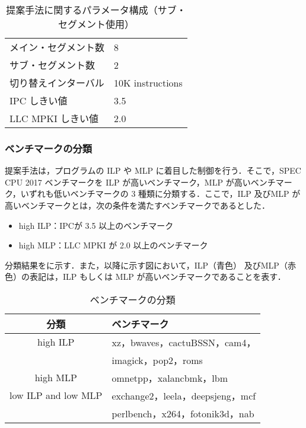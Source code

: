 \begin{table}[tb]
  \caption{提案手法に関するパラメータ構成（サブ・セグメント使用）}
  \footnotesize
  \center
    \begin{tabular}{l|l} \hline \hline
    メイン・セグメント数 & 8 \\
    サブ・セグメント数 & 2 \\
    切り替えインターバル & 10K instructions \\
    IPC しきい値 & 3.5 \\
    LLC MPKI しきい値 & 2.0 \\ \hline 
  \end{tabular}
  \label{tab:switch_config_subseg}
\end{table}

\subsubsection{ベンチマークの分類}
提案手法は，プログラムの ILP や MLP に着目した制御を行う．そこで，SPEC CPU 2017 ベンチマークを ILP が高いベンチマーク，MLP が高いベンチマーク，いずれも低いベンチマークの 3 種類に分類する．ここで，ILP 及びMLP が高いベンチマークとは，次の条件を満たすベンチマークであるとした．
\begin{itemize}
  \item high ILP：IPCが 3.5 以上のベンチマーク
  \item high MLP：LLC MPKI が 2.0 以上のベンチマーク
\end{itemize}

分類結果をに示す．また，以降に示す図において，ILP（青色） 及びMLP（赤色）の表記は，ILP もしくは MLP が高いベンチマークであることを表す．
\begin{table}[htb]
  \caption{ベンチマークの分類}
  \footnotesize
  \center
    \begin{tabular}{c|l} \hline \hline
    分類 & ベンチマーク\\ \hline
    high ILP & xz，bwaves，cactuBSSN，cam4，\\
             & imagick，pop2，roms\\ \hline
    high MLP &  omnetpp，xalancbmk，lbm\\ \hline
    low ILP and low MLP & exchange2，leela，deepsjeng，mcf\\
                        & perlbench，x264，fotonik3d，nab \\ \hline
  \end{tabular}
  \label{tab:classification}
\end{table}

